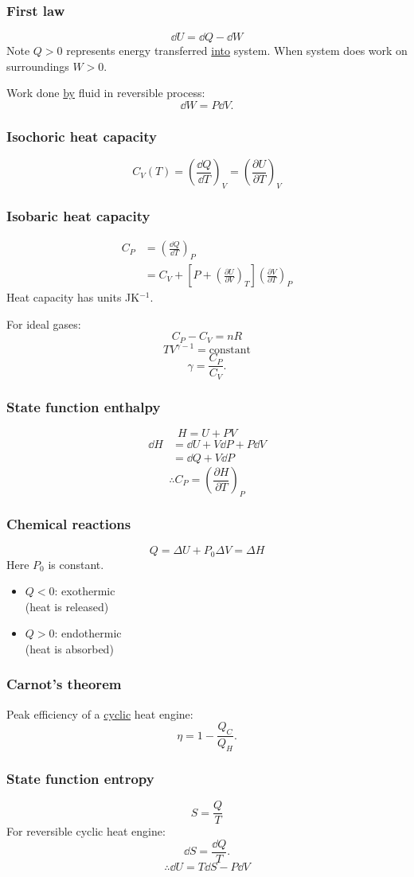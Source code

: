 \documentclass{article}
\begin{document}
\begin{multicols*}{3}
\subsubsection*{First law}
$$\dd U=\dd Q-\dd W$$
Note $Q>0$ represents energy transferred
\underline{into} system.
When system does work on surroundings $W>0$.

Work done \underline{by} fluid
in reversible process:
$$\dd W=P\dd V.$$

\subsubsection*{Isochoric heat capacity}
$$C_V(T)=\left(\frac{\dd Q}{\dd T}\right)_V
=\left(\frac{\partial U}{\partial T}\right)_V$$

\subsubsection*{Isobaric heat capacity}
\begin{align*}
    C_P
    &=\left(\frac{\dd Q}{\dd T}\right)_P \\
    &=C_V+\left[P+
    \left(\frac{\partial U}{\partial V}\right)_T\right]
    \left(\frac{\partial V}{\partial T}\right)_P
\end{align*}
Heat capacity has units JK$^{-1}$.

For ideal gases:
$$C_P-C_V=nR$$
$$TV^{\gamma-1}=\text{constant}$$
$$\gamma=\frac{C_P}{C_V}.$$

\subsubsection*{State function enthalpy}
$$H=U+PV$$
\begin{align*}
    \dd H
    &=\dd U+V\dd P+P\dd V \\
    &=\dd Q+V\dd P
\end{align*}
$$\therefore C_P
=\left(\frac{\partial H}{\partial T}\right)_P$$

\subsubsection*{Chemical reactions}
$$Q=\Delta U+P_0\Delta V=\Delta H$$
Here $P_0$ is constant.
\begin{itemize}
    \item $Q<0$: exothermic \\
    (heat is released)
    \item $Q>0$: endothermic \\
    (heat is absorbed)
\end{itemize}

\subsubsection*{Carnot's theorem}
Peak efficiency of a \underline{cyclic}
heat engine:
$$\eta=1-\frac{Q_C}{Q_H}.$$

\subsubsection*{State function entropy}
$$S=\frac{Q}{T}$$
For reversible cyclic heat engine:
$$\dd S=\frac{\dd Q}{T}.$$
$$\therefore\dd U=T\dd S-P\dd V$$



\end{multicols*}
\end{document}
